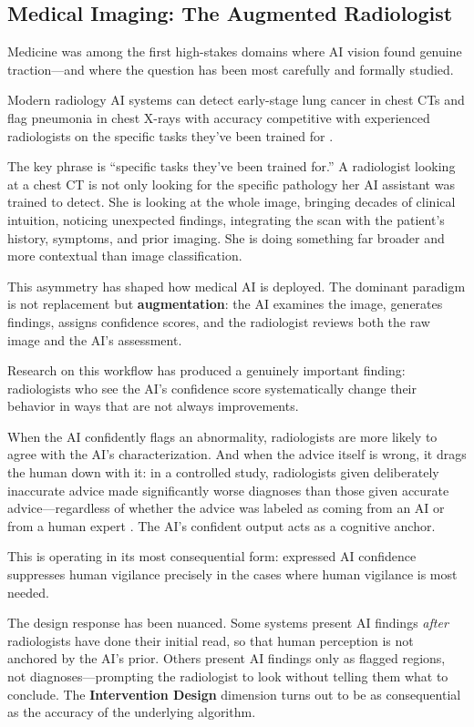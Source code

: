 \subsection{Medical Imaging: The Augmented Radiologist}

Medicine was among the first high-stakes domains where AI vision found genuine traction---and where the \hitl question has been most carefully and formally studied.

Modern radiology AI systems can detect early-stage lung cancer in chest CTs and flag pneumonia in chest X-rays with accuracy competitive with experienced radiologists on the specific tasks they've been trained for \autocite{ardila2019lung, rajpurkar2017chexnet}.

The key phrase is ``specific tasks they've been trained for.'' A radiologist looking at a chest CT is not only looking for the specific pathology her AI assistant was trained to detect. She is looking at the whole image, bringing decades of clinical intuition, noticing unexpected findings, integrating the scan with the patient's history, symptoms, and prior imaging. She is doing something far broader and more contextual than image classification.

This asymmetry has shaped how medical AI is deployed. The dominant paradigm is not replacement but \textbf{augmentation}: the AI examines the image, generates findings, assigns confidence scores, and the radiologist reviews both the raw image and the AI's assessment.

Research on this workflow has produced a genuinely important finding: radiologists who see the AI's confidence score systematically change their behavior in ways that are not always improvements.

When the AI confidently flags an abnormality, radiologists are more likely to agree with the AI's characterization. And when the advice itself is wrong, it drags the human down with it: in a controlled study, radiologists given deliberately inaccurate advice made significantly worse diagnoses than those given accurate advice---regardless of whether the advice was labeled as coming from an AI or from a human expert \autocite{gaube2021ai}. The AI's confident output acts as a cognitive anchor.

This is  operating in its most consequential form: expressed AI confidence suppresses human vigilance precisely in the cases where human vigilance is most needed.

The design response has been nuanced. Some systems present AI findings \emph{after} radiologists have done their initial read, so that human perception is not anchored by the AI's prior. Others present AI findings only as flagged regions, not diagnoses---prompting the radiologist to look without telling them what to conclude. The \textbf{Intervention Design} dimension turns out to be as consequential as the accuracy of the underlying algorithm.


